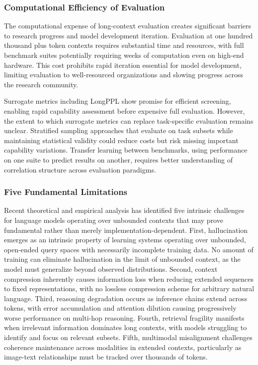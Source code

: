 \documentclass[11pt,letterpaper]{article}
\begin{document}
\subsubsection{Computational Efficiency of Evaluation}

The computational expense of long-context evaluation creates significant barriers to research progress and model development iteration. Evaluation at one hundred thousand plus token contexts requires substantial time and resources, with full benchmark suites potentially requiring weeks of computation even on high-end hardware. This cost prohibits rapid iteration essential for model development, limiting evaluation to well-resourced organizations and slowing progress across the research community.

Surrogate metrics including LongPPL show promise for efficient screening, enabling rapid capability assessment before expensive full evaluation. However, the extent to which surrogate metrics can replace task-specific evaluation remains unclear. Stratified sampling approaches that evaluate on task subsets while maintaining statistical validity could reduce costs but risk missing important capability variations. Transfer learning between benchmarks, using performance on one suite to predict results on another, requires better understanding of correlation structure across evaluation paradigms.

\subsubsection{Five Fundamental Limitations}

Recent theoretical and empirical analysis has identified five intrinsic challenges for language models operating over unbounded contexts that may prove fundamental rather than merely implementation-dependent. First, hallucination emerges as an intrinsic property of learning systems operating over unbounded, open-ended query spaces with necessarily incomplete training data. No amount of training can eliminate hallucination in the limit of unbounded context, as the model must generalize beyond observed distributions. Second, context compression inherently causes information loss when reducing extended sequences to fixed representations, with no lossless compression scheme for arbitrary natural language. Third, reasoning degradation occurs as inference chains extend across tokens, with error accumulation and attention dilution causing progressively worse performance on multi-hop reasoning. Fourth, retrieval fragility manifests when irrelevant information dominates long contexts, with models struggling to identify and focus on relevant subsets. Fifth, multimodal misalignment challenges coherence maintenance across modalities in extended contexts, particularly as image-text relationships must be tracked over thousands of tokens.
\end{document}
